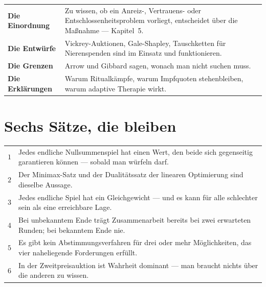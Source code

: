 \begin{merksatz}
\begin{center}
{\small
\renewcommand{\arraystretch}{1.5}
\begin{tabular}{@{}P{2.6cm}P{6.0cm}@{}}
\toprule
\textbf{Die Einordnung} & Zu wissen, ob ein Anreiz-, Vertrauens- oder Entschlossenheitsproblem vorliegt, entscheidet über die Maßnahme --- Kapitel~5.\\
\textbf{Die Entwürfe} & Vickrey-Auktionen, Gale-Shapley, Tauschketten für Nierenspenden sind im Einsatz und funktionieren.\\
\textbf{Die Grenzen} & Arrow und Gibbard sagen, wonach man nicht suchen muss.\\
\textbf{Die Erklärungen} & Warum Ritualkämpfe, warum Impfquoten stehenbleiben, warum adaptive Therapie wirkt.\\
\bottomrule
\end{tabular}}
\end{center}

\begin{center}
\begin{minipage}{0.88\textwidth}
\end{minipage}
\end{center}
\end{merksatz}

\section{Sechs Sätze, die bleiben}

\begin{merksatz}
\begin{center}
{\small
\renewcommand{\arraystretch}{1.55}
\begin{tabular}{@{}P{0.7cm}P{7.7cm}@{}}
\toprule
$1$ & Jedes endliche Nullsummenspiel hat einen Wert, den beide sich gegenseitig garantieren können --- sobald man würfeln darf.\\
$2$ & Der Minimax-Satz und der Dualitätssatz der linearen Optimierung sind dieselbe Aussage.\\
$3$ & Jedes endliche Spiel hat ein Gleichgewicht --- und es kann für alle schlechter sein als eine erreichbare Lage.\\
$4$ & Bei unbekanntem Ende trägt Zusammenarbeit bereits bei zwei erwarteten Runden; bei bekanntem Ende nie.\\
$5$ & Es gibt kein Abstimmungsverfahren für drei oder mehr Möglichkeiten, das vier naheliegende Forderungen erfüllt.\\
$6$ & In der Zweitpreisauktion ist Wahrheit dominant --- man braucht nichts über die anderen zu wissen.\\
\bottomrule
\end{tabular}}
\end{center}
\end{merksatz}

